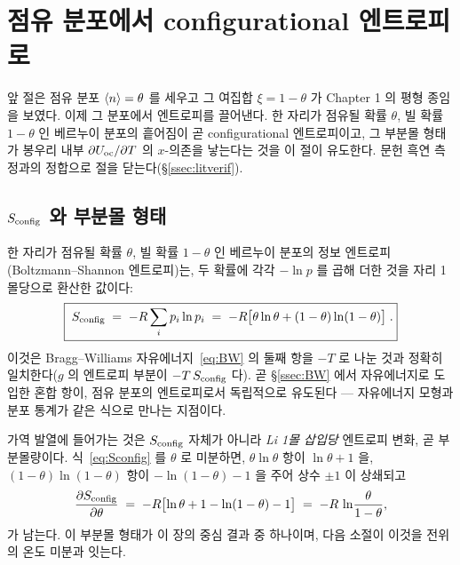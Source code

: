 \section{점유 분포에서 configurational 엔트로피로}\label{sec:config}

앞 절은 점유 분포 $\langle n\rangle=\theta$ 를 세우고 그 여집합 $\xi=1-\theta$ 가 Chapter 1 의 평형 종임을 보였다. 이제
그 분포에서 엔트로피를 끌어낸다. 한 자리가 점유될 확률 $\theta$, 빌 확률 $1-\theta$ 인 베르누이 분포의
흩어짐이 곧 configurational 엔트로피이고, 그 부분몰 형태가 봉우리 내부 $\partial U_{\mathrm{oc}}/\partial T$ 의 $x$-의존을
낳는다는 것을 이 절이 유도한다. 문헌 흑연 측정과의 정합으로 절을 닫는다(\S\ref{ssec:litverif}).

\subsection{$S_{\mathrm{config}}$ 와 부분몰 형태}\label{ssec:sconfig}
한 자리가 점유될 확률 $\theta$, 빌 확률 $1-\theta$ 인 베르누이 분포의 정보 엔트로피(Boltzmann--Shannon
엔트로피)는, 두 확률에 각각 $-\ln p$ 를 곱해 더한 것을 자리 1몰당으로 환산한 값이다:
\begin{equation}
\boxed{\;S_{\mathrm{config}} \;=\; -R\sum_i p_i\ln p_i
\;=\; -R\bigl[\theta\ln\theta + (1-\theta)\ln(1-\theta)\bigr]\;.}
\label{eq:Sconfig}
\end{equation}
이것은 Bragg--Williams 자유에너지~\eqref{eq:BW} 의 둘째 항을 $-T$ 로 나눈 것과 정확히 일치한다($g$ 의 엔트로피
부분이 $-T\,S_{\mathrm{config}}$ 다). 곧 \S\ref{ssec:BW} 에서 자유에너지로 도입한 혼합 항이, 점유 분포의 엔트로피로서
독립적으로 유도된다 --- 자유에너지 모형과 분포 통계가 같은 식으로 만나는 지점이다.

가역 발열에 들어가는 것은 $S_{\mathrm{config}}$ 자체가 아니라 \emph{Li 1몰 삽입당} 엔트로피 변화, 곧 부분몰량이다.
식~\eqref{eq:Sconfig} 를 $\theta$ 로 미분하면, $\theta\ln\theta$ 항이 $\ln\theta+1$ 을, $(1-\theta)\ln(1-\theta)$
항이 $-\ln(1-\theta)-1$ 을 주어 상수 $\pm1$ 이 상쇄되고
\begin{equation}
\frac{\partial S_{\mathrm{config}}}{\partial\theta}
\;=\; -R\bigl[\ln\theta + 1 - \ln(1-\theta) - 1\bigr]
\;=\; -R\,\ln\!\frac{\theta}{1-\theta},
\label{eq:dSconfig}
\end{equation}
가 남는다. 이 부분몰 형태가 이 장의 중심 결과 중 하나이며, 다음 소절이 이것을 전위의 온도 미분과 잇는다.

